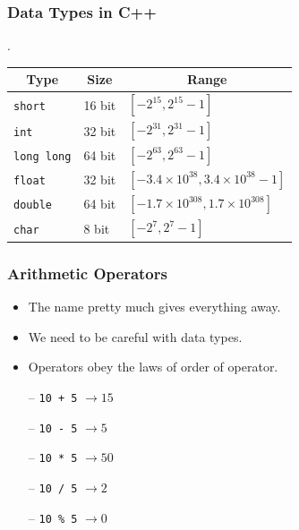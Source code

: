 \documentclass{beamer}
\begin{document}
\begin{frame}
	\frametitle{Data Types in C++}

	\begin{table}[]
		\bgroup
		\def\arraystretch{1.5}
		\setlength\tabcolsep{10pt}.
		\begin{tabular}{l|l|l}
			\multicolumn{1}{c|}{\textbf{Type}} & \multicolumn{1}{c|}{\textbf{Size}} & \multicolumn{1}{c}{\textbf{Range}} \\ \hline
			\texttt{short} & 16 bit & $[-2^{15}, 2^{15} - 1]$ \\
			\texttt{int} & 32 bit & $[-2^{31}, 2^{31} - 1]$ \\
			\texttt{long long} & 64 bit & $[-2^{63}, 2^{63} - 1]$ \\
			\texttt{float} & 32 bit & $[-3.4 \times 10^{38}, 3.4 \times 10^{38} - 1]$ \\
			\texttt{double} & 64 bit & $[-1.7 \times 10^{308}, 1.7 \times 10^{308}]$ \\
			\texttt{char} & 8 bit & $[-2^{7}, 2^{7} - 1]$						  
		\end{tabular}
		\egroup
	\end{table}
\end{frame}
	
\begin{frame}
	\frametitle{Arithmetic Operators}

	\begin{itemize}
		\item The name pretty much gives everything away.
		\item We need to be careful with data types.
		\item Operators obey the laws of order of operator.
	\end{itemize}

	\begin{tcolorbox}[title=Operators]
		\begin{itemize}
			\item[--] \texttt{10 + 5} $\rightarrow 15$
			\item[--] \texttt{10 - 5} $\rightarrow 5$
			\item[--] \texttt{10 * 5} $\rightarrow 50$
			\item[--] \texttt{10 / 5} $\rightarrow 2$
			\item[--] \texttt{10 \% 5} $\rightarrow 0$
		\end{itemize}
	\end{tcolorbox}
\end{frame}

\end{document}
